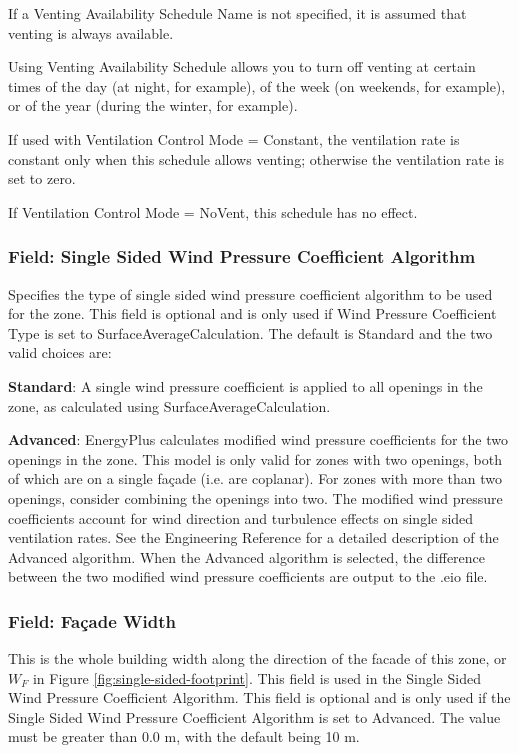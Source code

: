 If a Venting Availability Schedule Name is not specified, it is assumed that venting is always available.

Using Venting Availability Schedule allows you to turn off venting at certain times of the day (at night, for example), of the week (on weekends, for example), or of the year (during the winter, for example).

If used with Ventilation Control Mode = Constant, the ventilation rate is constant only when this schedule allows venting; otherwise the ventilation rate is set to zero.

If Ventilation Control Mode = NoVent, this schedule has no effect.

\subsubsection{Field: Single Sided Wind Pressure Coefficient Algorithm}

Specifies the type of single sided wind pressure coefficient algorithm to be used for
the zone. This field is optional and is only used if Wind Pressure Coefficient Type is
set to SurfaceAverageCalculation. The default is Standard and the two valid choices are:

\textbf{Standard}: A single wind pressure coefficient is applied to all openings in the
zone, as calculated using SurfaceAverageCalculation.

\textbf{Advanced}: EnergyPlus calculates modified wind pressure coefficients for the two
openings in the zone. This model is only valid for zones with two openings, both of which
are on a single fa\c{c}ade (i.e. are coplanar). For zones with more than two openings,
consider combining the openings into two. The modified wind pressure coefficients account
for wind direction and turbulence effects on single sided ventilation rates. See the
Engineering Reference for a detailed description of the Advanced algorithm. When the
Advanced algorithm is selected, the difference between the two modified wind pressure
coefficients are output to the .eio file.

\subsubsection{Field: Fa\c{c}ade Width}
This is the whole building width along the direction of the facade of this zone, or
$W_F$ in Figure \ref{fig:single-sided-footprint}. This field is used in the Single
Sided Wind Pressure Coefficient Algorithm. This field is optional and is only used if
the Single Sided Wind Pressure Coefficient Algorithm is set to Advanced. The value must
be greater than 0.0 m, with the default being 10 m.

